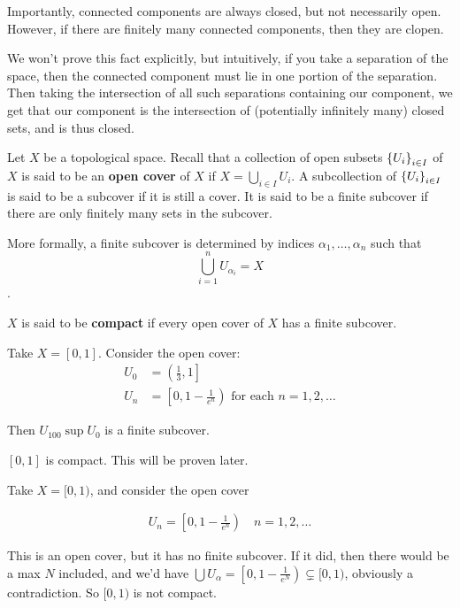 \documentclass[12pt, twosided]{article}
\begin{document}
Importantly, connected components are always closed, but not necessarily open. However, if there are finitely many connected components, then they are clopen.

We won't prove this fact explicitly, but intuitively, if you take a separation of the space, then the connected component must lie in one portion of the separation. Then taking the intersection of all such separations containing our component, we get that our component is the intersection of (potentially infinitely many) closed sets, and is thus closed.

\begin{df}
  Let \(X\) be a topological space. Recall that a collection of open subsets \(\left\{ U_i \right\}_{i \in I}\) of \(X\) is said to be an \textbf{open cover} of \(X\) if \(X = \bigcup_{i \in I} U_i\). A subcollection of \(\left\{ U_i \right\}_{i \in I}\) is said to be a subcover if it is still a cover. It is said to be a finite subcover if there are only finitely many sets in the subcover.

  More formally, a finite subcover is determined by indices \(\alpha_1,\ldots, \alpha_n\) such that \[\bigcup_{i = 1}^n U_{\alpha_i} = X\].
\end{df}

\begin{df}
\(X\) is said to be \textbf{compact} if every open cover of \(X\) has a finite subcover.
\end{df}

\begin{exa}
  Take \(X = [0,1]\). Consider the open cover:
  \begin{align*}
    U_0 &= \left(\frac{1}{3}, 1\right] \\
    U_n &= \left[0,1-\frac{1}{e^n}\right) \text{ for each } n= 1,2,\ldots
  \end{align*}

  Then \(U_{100} \sup U_0\) is a finite subcover.
\end{exa}

\begin{fact}
  \([0, 1]\) is compact. This will be proven later.
\end{fact}

\begin{exa}
  Take \(X = [0,1)\), and consider the open cover

  \begin{align*}
    U_n = \left[0, 1- \frac{1}{e^n}\right) \quad n = 1, 2,\ldots
  \end{align*}

  This is an open cover, but it has no finite subcover. If it did, then there would be a max \(N\) included, and we'd have \(\bigcup U_\alpha = \left[0, 1 - \frac{1}{e^N}\right) \subsetneq [0,1)\), obviously a contradiction. So \([0, 1)\) is not compact.
\end{exa}
\end{document}
